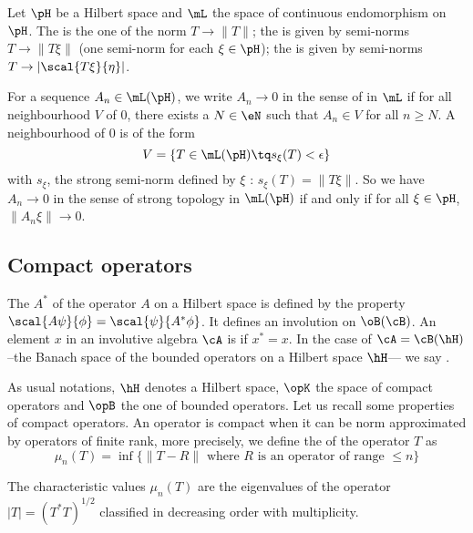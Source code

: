 Let $\pH$ be a Hilbert space and $\mL$ the space of continuous endomorphism on $\pH$. The  is the one of the norm $T\to\| T \|$; the  is given by semi-norms $T\to\| T\xi \|$ (one semi-norm for each $\xi\in\pH$); the  is given by semi-norms $T\to | \scal{ T\xi }{ \eta } |$.

For a sequence $A_n\in\mL(\pH)$, we write $A_n\to 0$ in the sense of  in $\mL$ if for all neighbourhood $V$ of $0$, there exists a $N\in\eN$ such that $A_n\in V$ for all $n\geq N$. A neighbourhood of $0$ is of the form
\[ 
  V=\{ T\in\mL(\pH)\tq s_{\xi}(T)<\epsilon \}
\]
with $s_{\xi}$, the strong semi-norm defined by $\xi$ : $s_{\xi}(T)=\| T\xi \|$. So we have $A_n\to 0$ in the sense of strong topology in $\mL(\pH)$ if and only if for all $\xi\in\pH$, $\| A_n\xi \|\to 0$.

\subsection{Compact operators}

\begin{definition}
The  $A^*$ of the operator $A$ on a Hilbert space is defined by the property $\scal{A\psi}{\phi}=\scal{\psi}{A^*\phi}$. It defines an involution on $\oB(\cB)$.  An element $x$ in an involutive algebra $\cA$ is  if $x^*=x$. In the case of $\cA=\cB(\hH)$ --the Banach space of the bounded operators on a Hilbert space $\hH$--- we say .
\end{definition}

As usual notations, $\hH$ denotes a Hilbert space, $\opK$ the space of compact operators and $\opB$ the one of bounded operators. Let us recall some properties of compact operators.  An operator is compact when it can be norm approximated by operators of finite rank, more precisely, we define the  of the operator $T$ as
\begin{equation}	\label{Defmuncaharacinfn}
  \mu_n(T)=\inf\{ \| T-R \| \textrm{ where $R$ is an operator of range $\leq n$} \}
\end{equation}

\begin{lemma}
The characteristic values $\mu_n(T)$ are the eigenvalues of the operator $| T |=(T^*T)^{1/2}$ classified in decreasing order with multiplicity. 
\end{lemma}



